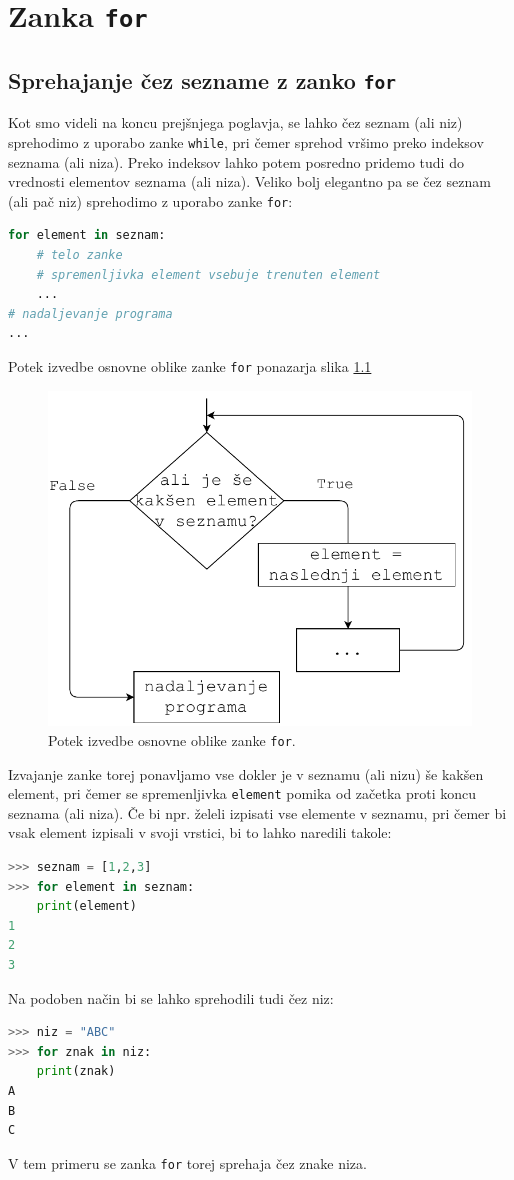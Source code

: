 \chapter{Zanka \texttt{for}}

\section{Sprehajanje čez sezname z zanko \texttt{for}}
Kot smo videli na koncu prejšnjega poglavja, se lahko čez seznam (ali niz) sprehodimo z uporabo zanke \texttt{while}, pri čemer sprehod vršimo preko indeksov seznama (ali niza). Preko indeksov lahko potem posredno pridemo tudi do vrednosti elementov seznama (ali niza). Veliko bolj elegantno pa se čez seznam (ali pač niz) sprehodimo z uporabo zanke \texttt{for}:
\begin{lstlisting}[language=Python, showstringspaces=false]
for element in seznam:
    # telo zanke
    # spremenljivka element vsebuje trenuten element
    ...
# nadaljevanje programa
...
\end{lstlisting}
Potek izvedbe osnovne oblike zanke \texttt{for} ponazarja slika \ref{img:for1}
\begin{figure}
    \centering
    \includegraphics[width=0.5\linewidth]{img/for1.pdf}
    \caption{Potek izvedbe osnovne oblike zanke \texttt{for}.}
    \label{img:for1}
\end{figure}
Izvajanje zanke torej ponavljamo vse dokler je v seznamu (ali nizu) še kakšen element, pri čemer se spremenljivka \texttt{element} pomika od začetka proti koncu seznama (ali niza). Če bi npr. želeli izpisati vse elemente v seznamu, pri čemer bi vsak element izpisali v svoji vrstici, bi to lahko naredili takole:
\begin{lstlisting}[language=Python, showstringspaces=false]
>>> seznam = [1,2,3]
>>> for element in seznam:
	print(element)
1
2
3
\end{lstlisting}
Na podoben način bi se lahko sprehodili tudi čez niz:
\begin{lstlisting}[language=Python, showstringspaces=false]
>>> niz = "ABC"
>>> for znak in niz:
	print(znak)
A
B
C
\end{lstlisting}
V tem primeru se zanka \texttt{for} torej sprehaja čez znake niza.

